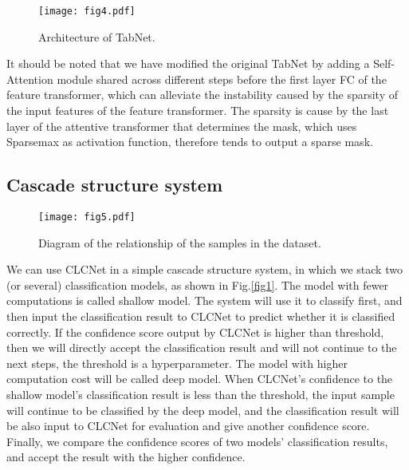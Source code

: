 \documentclass{article}
\begin{document}
\begin{figure}
  \vspace{0em}  
  \centering
  \texttt{[image: fig4.pdf]}
  \caption{Architecture of TabNet.}
  \label{fig4}
  \vspace{-0em}  \end{figure}


It should be noted that we have modified the original TabNet by adding a Self-Attention \cite{vaswani2017attention} module shared across different steps before the first layer FC of the feature transformer, which can alleviate the instability caused by the sparsity of the input features of the feature transformer. The sparsity is cause by the last layer of the attentive transformer that determines the mask, which uses Sparsemax \cite{martins2016softmax} as activation function, therefore tends to output a sparse mask.

\newpage
\subsection{Cascade structure system}

\begin{wrapfigure}{r}{0.4\textwidth}
  \vspace{-2em}  
  \centering
  \texttt{[image: fig5.pdf]}
  \caption{Diagram of the relationship of the samples in the dataset.}
  \label{fig5}
  \vspace{-1em}  \end{wrapfigure}

We can use CLCNet in a simple cascade structure system, in which we stack two (or several) classification models, as shown in Fig.\ref{fig1}. The model with fewer computations is called shallow model. The system will use it to classify first, and then input the classification result to CLCNet to predict whether it is classified correctly. If the confidence score output by CLCNet is higher than threshold, then we will directly accept the classification result and will not continue to the next steps, the threshold is a hyperparameter. The model with higher computation cost will be called deep model. When CLCNet's confidence to the shallow model's classification result is less than the threshold, the input sample will continue to be classified by the deep model, and the classification result will be also input to CLCNet for evaluation and give another confidence score. Finally, we compare the confidence scores of two models’ classification results, and accept the result with the higher confidence. 
\end{document}
